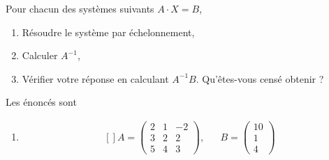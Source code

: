 

\begin{exercice}\label{exoINGE1121La0010}

	Pour chacun des systèmes suivants $A\cdot X=B$,
	\begin{enumerate}

		\item
			Résoudre le système par échelonnement,
		\item
			Calculer $A^{-1}$,
		\item
			Vérifier votre réponse en calculant $A^{-1}B$. Qu'êtes-vous censé obtenir ?

	\end{enumerate}

	Les énoncés sont
	\begin{enumerate}

		\item
			\begin{equation}
				\begin{aligned}[]
					A=\begin{pmatrix}
						2	&	1	&	-2	\\
						3	&	2	&	2	\\
						5	&	4	&	3
					\end{pmatrix},
					&&B=\begin{pmatrix}
						10	\\ 
						1	\\ 
						4	
					\end{pmatrix}
				\end{aligned}
			\end{equation}
	\end{enumerate}

\end{exercice}
